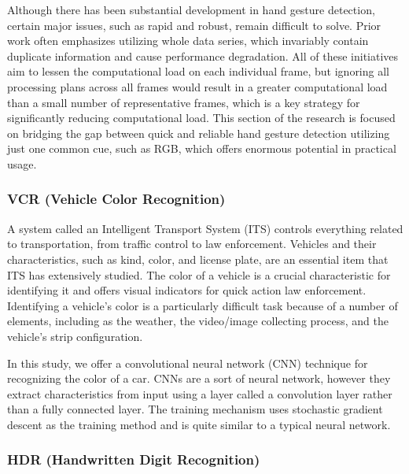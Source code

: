 \documentclass[letterpaper, 10 pt, conference]{ieeeconf}  %
\begin{document}
Although there has been substantial development in hand gesture detection, certain major issues, such as rapid and robust, remain difficult to solve. Prior work often emphasizes utilizing whole data series, which invariably contain duplicate information and cause performance degradation. All of these initiatives aim to lessen the computational load on each individual frame, but ignoring all processing plans across all frames would result in a greater computational load than a small number of representative frames, which is a key strategy for significantly reducing computational load. This section of the research is focused on bridging the gap between quick and reliable hand gesture detection utilizing just one common cue, such as RGB, which offers enormous potential in practical usage. \par

\subsubsection*{\bf VCR (Vehicle Color Recognition)}
A system called an Intelligent Transport System (ITS) controls everything related to transportation, from traffic control to law enforcement. Vehicles and their characteristics, such as kind, color, and license plate, are an essential item that ITS has extensively studied. The color of a vehicle is a crucial characteristic for identifying it and offers visual indicators for quick action law enforcement. Identifying a vehicle's color is a particularly difficult task because of a number of elements, including as the weather, the video/image collecting process, and the vehicle's strip configuration. \par

In this study, we offer a convolutional neural network (CNN) technique for recognizing the color of a car. CNNs are a sort of neural network, however they extract characteristics from input using a layer called a convolution layer rather than a fully connected layer. The training mechanism uses stochastic gradient descent as the training method and is quite similar to a typical neural network. \par

\subsubsection*{\bf HDR (Handwritten Digit Recognition)}
\end{document}
